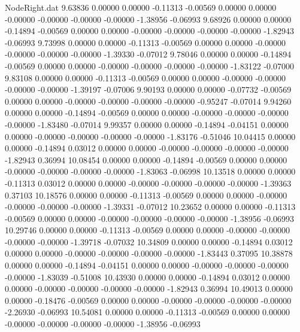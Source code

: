 \begin{filecontents}{NodeRight.dat}
   9.63836    0.00000    0.00000    -0.11313   -0.00569    0.00000    0.00000   -0.00000   -0.00000   -0.00000   -0.00000   -1.38956   -0.06993
   9.68926    0.00000    0.00000    -0.14894   -0.00569    0.00000    0.00000   -0.00000   -0.00000   -0.00000   -0.00000   -1.82943   -0.06993
   9.73998    0.00000    0.00000    -0.11313   -0.00569    0.00000    0.00000   -0.00000   -0.00000   -0.00000   -0.00000   -1.39330   -0.07012
   9.78046    0.00000    0.00000    -0.14894   -0.00569    0.00000    0.00000   -0.00000   -0.00000   -0.00000   -0.00000   -1.83122   -0.07000
   9.83108    0.00000    0.00000    -0.11313   -0.00569    0.00000    0.00000   -0.00000   -0.00000   -0.00000   -0.00000   -1.39197   -0.07006
   9.90193    0.00000    0.00000    -0.07732   -0.00569    0.00000    0.00000   -0.00000   -0.00000   -0.00000   -0.00000   -0.95247   -0.07014
   9.94260    0.00000    0.00000    -0.14894   -0.00569    0.00000    0.00000   -0.00000   -0.00000   -0.00000   -0.00000   -1.83480   -0.07014
   9.99357    0.00000    0.00000    -0.14894   -0.04151    0.00000    0.00000   -0.00000   -0.00000   -0.00000   -0.00000   -1.83176   -0.51046
  10.04415    0.00000    0.00000    -0.14894    0.03012    0.00000    0.00000   -0.00000   -0.00000   -0.00000   -0.00000   -1.82943    0.36994
  10.08454    0.00000    0.00000    -0.14894   -0.00569    0.00000    0.00000   -0.00000   -0.00000   -0.00000   -0.00000   -1.83063   -0.06998
  10.13518    0.00000    0.00000    -0.11313    0.03012    0.00000    0.00000   -0.00000   -0.00000   -0.00000   -0.00000   -1.39363    0.37103
  10.18576    0.00000    0.00000    -0.11313   -0.00569    0.00000    0.00000   -0.00000   -0.00000   -0.00000   -0.00000   -1.39331   -0.07012
  10.23652    0.00000    0.00000    -0.11313   -0.00569    0.00000    0.00000   -0.00000   -0.00000   -0.00000   -0.00000   -1.38956   -0.06993
  10.29746    0.00000    0.00000    -0.11313   -0.00569    0.00000    0.00000   -0.00000   -0.00000   -0.00000   -0.00000   -1.39718   -0.07032
  10.34809    0.00000    0.00000    -0.14894    0.03012    0.00000    0.00000   -0.00000   -0.00000   -0.00000   -0.00000   -1.83443    0.37095
  10.38878    0.00000    0.00000    -0.14894   -0.04151    0.00000    0.00000   -0.00000   -0.00000   -0.00000   -0.00000   -1.83039   -0.51008
  10.43930    0.00000    0.00000    -0.14894    0.03012    0.00000    0.00000   -0.00000   -0.00000   -0.00000   -0.00000   -1.82943    0.36994
  10.49013    0.00000    0.00000    -0.18476   -0.00569    0.00000    0.00000   -0.00000   -0.00000   -0.00000   -0.00000   -2.26930   -0.06993
  10.54081    0.00000    0.00000    -0.11313   -0.00569    0.00000    0.00000   -0.00000   -0.00000   -0.00000   -0.00000   -1.38956   -0.06993

\end{filecontents}
